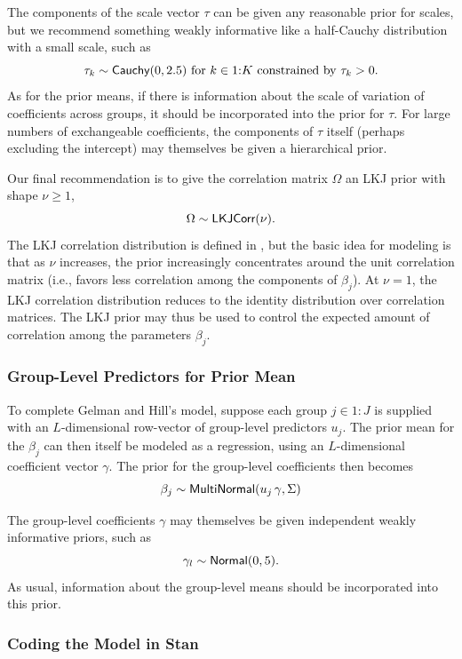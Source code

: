 The components of the scale vector $\tau$ can be given any reasonable
prior for scales, but we recommend something weakly informative like a
half-Cauchy distribution with a small scale, such as
\[
\tau_k \sim \mbox{\sf Cauchy}(0, 2.5)
\mbox{ for } k \in 1{:}K \mbox{ constrained by } \tau_k > 0.
\]
As for the prior means, if there is information about the scale of
variation of coefficients across groups, it should be incorporated
into the prior for $\tau$.  For large numbers of exchangeable
coefficients, the components of $\tau$ itself (perhaps excluding the
intercept) may themselves be given a hierarchical prior.

Our final recommendation is to give the correlation matrix $\Omega$ an
LKJ prior with shape $\nu \geq 1$,
\[
\Omega \sim \mbox{\sf LKJCorr}(\nu).
\]
The LKJ correlation distribution is defined in
, but the basic idea for modeling is that
as $\nu$ increases, the prior increasingly concentrates around the
unit correlation matrix (i.e., favors less correlation among the
components of $\beta_{j}$).  At $\nu = 1$, the LKJ correlation
distribution reduces to the identity distribution over correlation
matrices.  The LKJ prior may thus be used to control the expected
amount of correlation among the parameters $\beta_j$.

\subsubsection{Group-Level Predictors for Prior Mean}

To complete Gelman and Hill's model, suppose each group $j \in 1{:}J$
is supplied with an $L$-dimensional row-vector of group-level
predictors $u_j$.  The prior mean for the $\beta_j$ can then itself be
modeled as a regression, using an $L$-dimensional coefficient vector
$\gamma$.  The prior for the group-level coefficients then becomes
\[
\beta_j \sim \mbox{\sf MultiNormal}(u_j \, \gamma, \Sigma)
\]

The group-level coefficients $\gamma$ may themselves be given
independent weakly informative priors, such as
\[
\gamma_l \sim \mbox{\sf Normal}(0,5).
\]
As usual, information about the group-level means should be
incorporated into this prior.


\subsubsection{Coding the Model in Stan}

